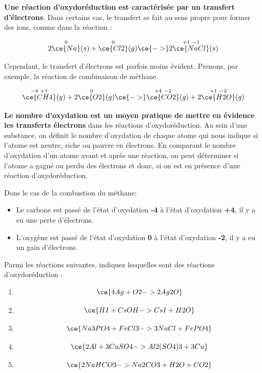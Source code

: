 \documentclass[
  11pt,
  a4paper,
  openany]{book}
\providecommand{\tightlist}{%
  \setlength{\itemsep}{0pt}\setlength{\parskip}{0pt}}
\begin{document}
\textbf{Une réaction d'oxydoréduction est caractérisée par un transfert d'électrons}. Dans certains cas, le transfert se fait au sens propre pour former des ions, comme dans la réaction :

\[
2\overset{0}{\ce{Na}}(s) + \overset{0}{\ce{Cl2}}(g) \ce{->} 2\overset{+1\ -1}{\ce{NaCl}}(s)
\]

Cependant, le transfert d'électrons est parfois moins évident. Prenons, par exemple, la réaction de combinaison de méthane.

\[
\overset{-4\ +1}{\ce{CH4}}(g) + 2\overset{0}{\ce{O2}}(g) \ce{->} \overset{+4\ -2}{\ce{CO2}}(g) + 2\overset{+1\ -2}{\ce{H2O}}(g)
\]

\textbf{Le nombre d'oxydation est un moyen pratique de mettre en évidence les transferts électrons} dans les réactions d'oxydoréduction. Au sein d'une substance, on définit le nombre d'oxydation de chaque atome qui nous indique si l'atome est neutre, riche ou pauvre en électrons. En comparant le nombre d'oxydation d'un atome avant et après une réaction, on peut déterminer si l'atome a gagné ou perdu des électrons et donc, si on est en présence d'une réaction d'oxydoréduction.

Dans le cas de la combustion du méthane:

\begin{itemize}
\tightlist
\item
  Le carbone est passé de l'état d'oxydation \textbf{-4} à l'état d'oxydation \textbf{+4}, il y a eu une perte d'électrons.
\item
  L'oxygène est passé de l'état d'oxydation \textbf{0} à l'état d'oxydation \textbf{-2}, il y a eu un gain d'électrons.
\end{itemize}

\begin{Exercise}

Parmi les réactions suivantes, indiquez lesquelles sont des réactions d'oxydoréduction :

\begin{enumerate}
\def\labelenumi{\alph{enumi}.}
\tightlist
\item
  \[
  \ce{4 Ag + O2 -> 2 Ag2O}
  \]
\item
  \[
  \ce{HI + CsOH -> CsI + H2O}
  \]
\item
  \[
  \ce{Na3PO4 + FeCl3 -> 3 NaCl + FePO4}
  \]
\item
  \[
  \ce{2 Al + 3 CuSO4 -> Al2(SO4)3 + 3 Cu}
  \]
\item
  \[
  \ce{2 NaHCO3 -> Na2CO3 + H2O + CO2}
  \]
\end{enumerate}

\end{Exercise}
\end{document}
